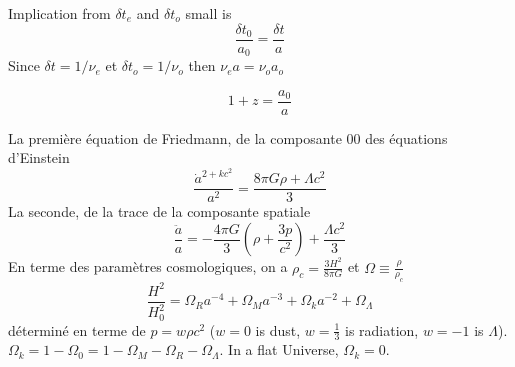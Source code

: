 Implication from $\delta t_e$ and $\delta t_o$ small is
\begin{equation}\label{eq:}
       \frac{\delta t_0}{a_0}  = \frac{\delta t}{a}
\end{equation} 
Since $\delta t = 1/\nu_e$ et $\delta t_o = 1/\nu_o$ then $\nu_e a = \nu_o a_o$

\begin{equation}\label{eq:}
        1  + z = \frac{a_0}{a}
\end{equation} 

La première équation de Friedmann, de la composante $00$ des équations d'Einstein
\begin{equation}\label{eq:Friedmann1}
        \frac{\dot{a}^{2 + kc^2}}{a^{2}} = \frac{8 \pi G \rho + \Lambda c^2}{3}
\end{equation} 
La seconde, de la trace de la composante spatiale
\begin{equation}\label{eq:Friedmann}
        \frac{\ddot{a}}{a} = -\frac{4 \pi G}{3} \left( \rho + \frac{3p}{c^{2}} \right) + \frac{\Lambda c^{2}}{3}
\end{equation} 
En terme des paramètres cosmologiques, on a $\rho_c = \frac{3H^{2}}{8 \pi G}$ et $\Omega \equiv \frac{\rho}{\rho_c}$
\begin{equation}\label{eq:}
        \frac{H^{2}}{H_0^{2}} = \Omega_{R} a^{-4} + \Omega_M a^{-3} + \Omega_k a^{-2} + \Omega_\Lambda
\end{equation} 
déterminé en terme de $p = w \rho c^{2}$ ($w = 0$ is dust, $w = \frac{1}{3}$ is radiation, $w = -1$ is $\Lambda$). 
$\Omega_k = 1 - \Omega_0 = 1 - \Omega_M - \Omega_R - \Omega_\Lambda$. In a flat Universe, $\Omega_k = 0$.




